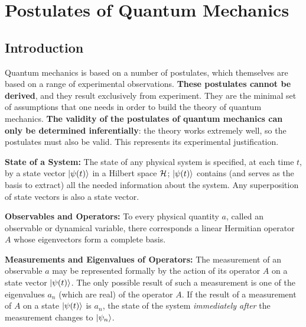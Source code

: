 \section{Postulates of Quantum Mechanics}

\subsection{Introduction}

Quantum mechanics is based on a number of postulates, which themselves are based on a range of experimental observations. \textbf{These postulates cannot be derived}, and they result exclusively from experiment. They are the minimal set of assumptions that one needs in order to build the theory of quantum mechanics. \textbf{The validity of the postulates of quantum mechanics can only be determined inferentially}: the theory works extremely well, so the postulates must also be valid. This represents its experimental justification.

\begin{postulate}
    \textbf{State of a System:} The state of any physical system is specified, at each time $t$, by a state vector $\ket{\psi(t)}$ in a Hilbert space $\mathcal{H}$; $\ket{\psi(t)}$ contains (and serves as the basis to extract) all the needed information about the system. Any superposition of state vectors is also a state vector.
\end{postulate}

\begin{postulate}
    \textbf{Observables and Operators:} To every physical quantity $a$, called an observable or dynamical variable, there corresponds a linear Hermitian operator $A$ whose eigenvectors form a complete basis.
\end{postulate}

\begin{postulate}
    \textbf{Measurements and Eigenvalues of Operators:} The measurement of an observable $a$ may be represented formally by the action of its operator $A$ on a state vector $\ket{\psi(t)}$. The only possible result of such a measurement is one of the eigenvalues $a_n$ (which are real) of the operator $A$. If the result of a measurement of $A$ on a state $\ket{\psi(t)}$ is $a_n$, the state of the system \textit{immediately after} the measurement changes to $\ket{\psi_n}$.
\end{postulate}

